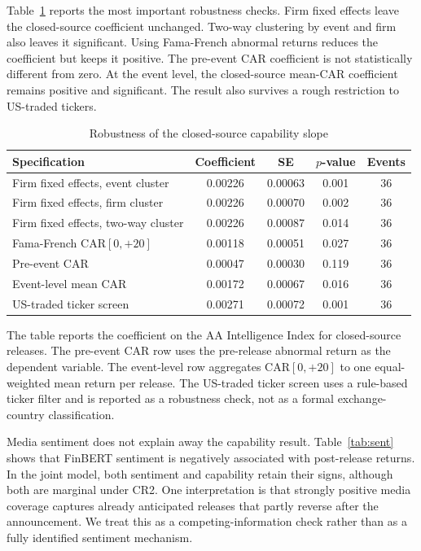 \documentclass[12pt]{article}
\begin{document}
Table~\ref{tab:robust} reports the most important robustness checks. Firm fixed
effects leave the closed-source coefficient unchanged. Two-way clustering by
event and firm also leaves it significant. Using Fama-French abnormal returns
reduces the coefficient but keeps it positive. The pre-event CAR coefficient is
not statistically different from zero. At the event level, the closed-source
mean-CAR coefficient remains positive and significant. The result also survives
a rough restriction to US-traded tickers.

\begin{table}[htbp]
\centering
\caption{Robustness of the closed-source capability slope}
\label{tab:robust}
\begin{threeparttable}
\begin{tabular}{lcccc}
\toprule
Specification & Coefficient & SE & $p$-value & Events \\
\midrule
Firm fixed effects, event cluster & 0.00226 & 0.00063 & 0.001 & 36 \\
Firm fixed effects, firm cluster & 0.00226 & 0.00070 & 0.002 & 36 \\
Firm fixed effects, two-way cluster & 0.00226 & 0.00087 & 0.014 & 36 \\
Fama-French CAR$[0,{+}20]$ & 0.00118 & 0.00051 & 0.027 & 36 \\
Pre-event CAR & 0.00047 & 0.00030 & 0.119 & 36 \\
Event-level mean CAR & 0.00172 & 0.00067 & 0.016 & 36 \\
US-traded ticker screen & 0.00271 & 0.00072 & 0.001 & 36 \\
\bottomrule
\end{tabular}
\begin{tablenotes}[flushleft]\footnotesize
\item The table reports the coefficient on the AA Intelligence Index for
closed-source releases. The pre-event CAR row uses the pre-release abnormal
return as the dependent variable. The event-level row aggregates CAR$[0,{+}20]$
to one equal-weighted mean return per release. The US-traded ticker screen uses a
rule-based ticker filter and is reported as a robustness check, not as a formal
exchange-country classification.
\end{tablenotes}
\end{threeparttable}
\end{table}

Media sentiment does not explain away the capability result. Table~\ref{tab:sent}
shows that FinBERT sentiment is negatively associated with post-release returns.
In the joint model, both sentiment and capability retain their signs, although
both are marginal under CR2. One interpretation is that strongly positive media
coverage captures already anticipated releases that partly reverse after the
announcement. We treat this as a competing-information check rather than as a
fully identified sentiment mechanism.
\end{document}
